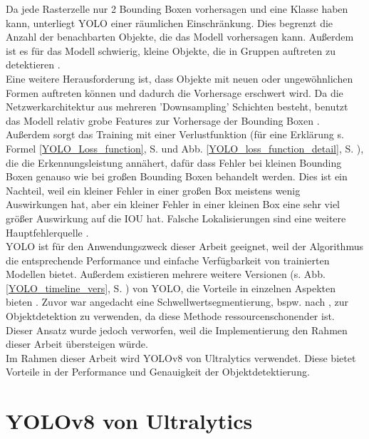 {{	Da jede Rasterzelle nur 2 Bounding Boxen vorhersagen und eine Klasse haben kann, unterliegt YOLO einer räumlichen Einschränkung. Dies begrenzt die Anzahl der benachbarten Objekte, die das Modell vorhersagen kann. Außerdem ist es für das Modell schwierig, kleine Objekte, die in Gruppen auftreten zu detektieren \citep{Redmon2016}. \\
	Eine weitere Herausforderung ist, dass Objekte mit neuen oder ungewöhnlichen Formen auftreten können und dadurch die Vorhersage erschwert wird. Da die Netzwerkarchitektur aus mehreren 'Downsampling' Schichten besteht, benutzt das Modell relativ grobe Features zur Vorhersage der Bounding Boxen \citep{Redmon2016}. \\
	Außerdem sorgt das Training mit einer Verlustfunktion (für eine Erklärung s.  Formel \ref{YOLO_Loss_function}, S. \pageref{YOLO_Loss_function} und Abb.  \ref{YOLO_loss_function_detail}, S. \pageref{YOLO_loss_function_detail}), die die Erkennungsleistung annähert, dafür dass Fehler bei kleinen Bounding Boxen genauso wie bei großen Bounding Boxen behandelt werden. Dies ist ein Nachteil, weil ein kleiner Fehler in einer großen Box meistens wenig Auswirkungen hat, aber ein kleiner Fehler in einer kleinen Box eine sehr viel größer Auswirkung auf die IOU hat. Falsche Lokalisierungen sind eine weitere Hauptfehlerquelle \citep{Redmon2016}. \\
	YOLO ist für den Anwendungszweck dieser Arbeit geeignet, weil der Algorithmus die entsprechende Performance und einfache Verfügbarkeit von trainierten Modellen bietet. Außerdem existieren mehrere weitere Versionen (s. Abb. \ref{YOLO_timeline_vers}, S. \pageref{YOLO_timeline_vers}) von YOLO, die Vorteile in einzelnen Aspekten bieten \citep{Terven2023}. Zuvor war angedacht eine Schwellwertsegmentierung, bspw. nach \citeauthor{Otsu1979} \citep{Otsu1979}, zur Objektdetektion zu verwenden, da diese Methode ressourcenschonender ist. Dieser Ansatz wurde jedoch verworfen, weil die Implementierung den Rahmen dieser Arbeit übersteigen würde.\\

	Im Rahmen dieser Arbeit wird YOLOv8 von Ultralytics verwendet. Diese bietet Vorteile in der Performance und Genauigkeit der Objektdetektierung. 
	} 

	\section{YOLOv8 von Ultralytics}{ \label{subsec:YOLOv8_theoretic}
	
}}
